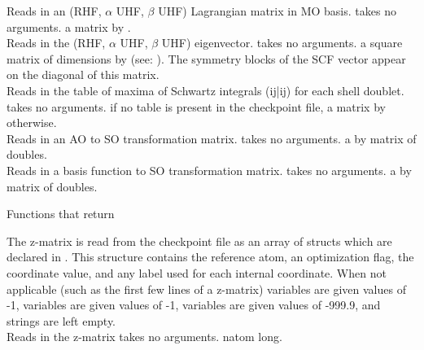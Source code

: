 {Reads in an (RHF, $\alpha$ UHF, $\beta$ UHF) Lagrangian matrix in MO basis.}
{takes no arguments.}
{a matrix  by .} \\
{Reads in the (RHF, $\alpha$ UHF, $\beta$ UHF) eigenvector.}
{takes no arguments.}
{a square matrix of dimensions 
by  (see: ).
The symmetry blocks of the SCF vector appear
on the diagonal of this matrix.} \\
{Reads in the table of maxima of Schwartz integrals (ij|ij)
for each shell doublet.}
{takes no arguments.}
{ if no table is present in the checkpoint file,
a matrix  by  otherwise.} \\
{Reads in an AO to SO transformation matrix.}
{takes no arguments.}
{a  by  matrix of doubles.} \\
{Reads in a basis function to SO transformation matrix.}
{takes no arguments.}
{a  by  matrix of doubles.}

\begin{center}
Functions that return  
\end{center}
{The z-matrix is read from the checkpoint file as an array of  structs
which are declared in .  This structure contains the reference atom,
an optimization flag, the coordinate value, and any label used for each internal 
coordinate.  When not applicable (such as the first few lines of a z-matrix) 
 variables are given values of -1,
 variables are given values of -1,  variables are
given values of -999.9, and  strings are left empty.} \\
{Reads in the z-matrix}
{takes no arguments.}
{  natom long.} 
